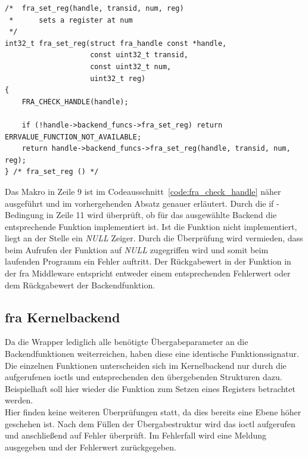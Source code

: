 \begin{lstfloat}
\begin{lstlisting}
/*  fra_set_reg(handle, transid, num, reg)
 *      sets a register at num
 */
int32_t fra_set_reg(struct fra_handle const *handle,
					const uint32_t transid,
					const uint32_t num, 
					uint32_t reg)
{
	FRA_CHECK_HANDLE(handle);

	if (!handle->backend_funcs->fra_set_reg) return ERRVALUE_FUNCTION_NOT_AVAILABLE;
	return handle->backend_funcs->fra_set_reg(handle, transid, num, reg);
} /* fra_set_reg () */
\end{lstlisting}
\end{lstfloat}

Das Makro in Zeile 9 ist im Codeausschnitt~\ref{code:fra_check_handle} näher ausgeführt und im vorhergehenden Absatz genauer erläutert.
Durch die if - Bedingung in Zeile 11 wird überprüft, ob für das ausgewählte Backend die entsprechende Funktion implementiert ist. Ist die Funktion nicht implementiert, liegt an der Stelle ein \textit{NULL} Zeiger. Durch die Überprüfung wird vermieden, dass beim Aufrufen der Funktion auf \textit{NULL} zugegriffen wird und somit beim laufenden Programm ein Fehler auftritt. Der Rückgabewert in der Funktion in der \ac{fra} Middleware entspricht entweder einem entsprechenden Fehlerwert oder dem Rückgabewert der Backendfunktion. 


\subsection{\ac{fra} Kernelbackend}
Da die Wrapper lediglich alle benötigte Übergabeparameter an die Backendfunktionen weiterreichen, haben diese eine identische Funktionssignatur. 
Die einzelnen Funktionen unterscheiden sich im Kernelbackend nur durch die aufgerufenen \ac{ioctl}s und entsprechenden den übergebenden Strukturen dazu. Beispielhaft soll hier wieder die Funktion zum Setzen eines Registers betrachtet werden. \\


Hier finden keine weiteren Überprüfungen statt, da dies bereits eine Ebene höher geschehen ist. Nach dem Füllen der Übergabestruktur wird das \ac{ioctl} aufgerufen und anschließend auf Fehler überprüft. 
Im Fehlerfall wird eine Meldung ausgegeben und der Fehlerwert zurückgegeben. 

